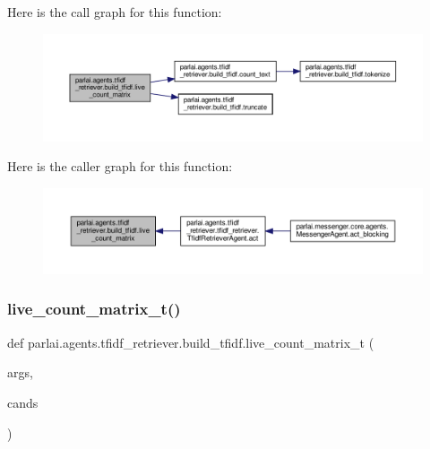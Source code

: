 Here is the call graph for this function\+:
\nopagebreak
\begin{figure}[H]
\begin{center}
\leavevmode
\includegraphics[width=350pt]{namespaceparlai_1_1agents_1_1tfidf__retriever_1_1build__tfidf_af51dc8629608fd04435739ba76b1e8f2_cgraph}
\end{center}
\end{figure}
Here is the caller graph for this function\+:
\nopagebreak
\begin{figure}[H]
\begin{center}
\leavevmode
\includegraphics[width=350pt]{namespaceparlai_1_1agents_1_1tfidf__retriever_1_1build__tfidf_af51dc8629608fd04435739ba76b1e8f2_icgraph}
\end{center}
\end{figure}
\mbox{\label{namespaceparlai_1_1agents_1_1tfidf__retriever_1_1build__tfidf_af6a82e7b8a6efb75fb73be53b55a7787}} 
\subsubsection{\texorpdfstring{live\+\_\+count\+\_\+matrix\+\_\+t()}{live\_count\_matrix\_t()}}
{\footnotesize\ttfamily def parlai.\+agents.\+tfidf\+\_\+retriever.\+build\+\_\+tfidf.\+live\+\_\+count\+\_\+matrix\+\_\+t (\begin{DoxyParamCaption}\item[{}]{args,  }\item[{}]{cands }\end{DoxyParamCaption})}



